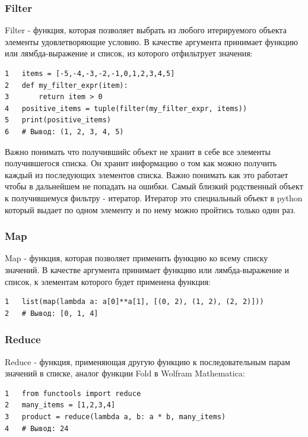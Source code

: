 \documentclass[12pt, a4paper]{article}
\begin{document}
\subsubsection{Filter}

Filter - функция, которая позволяет выбрать из любого 
итерируемого объекта элементы удовлетворяющие условию. 
В качестве аргумента принимает функцию или лямбда-выражение
и список, из которого отфильтрует значения:

\begin{verbatim}
1   items = [-5,-4,-3,-2,-1,0,1,2,3,4,5]
2   def my_filter_expr(item):
3       return item > 0
4   positive_items = tuple(filter(my_filter_expr, items))
5   print(positive_items)
6   # Вывод: (1, 2, 3, 4, 5)
\end{verbatim}

Важно понимать что получившийс объект не хранит в себе все 
элементы получившегося списка. Он хранит информацию о том 
как можно получить каждый из последующих элементов списка. 
Важно понимать как это работает чтобы в дальнейшем не попадать
на ошибки. Самый близкий родственный объект к получившемуся 
фильтру - итератор. Итератор это специальный объект в python 
который выдает по одном элементу и по нему можно пройтись 
только один раз.

\subsubsection{Map}

Map - функция, которая позволяет применить функцию ко всему 
списку значений. В качестве аргумента принимает функцию или 
лямбда-выражение и список, к элементам которого будет 
применена функция:

\begin{verbatim}
1   list(map(lambda a: a[0]**a[1], [(0, 2), (1, 2), (2, 2)]))
2   # Вывод: [0, 1, 4]
\end{verbatim}

\subsubsection{Reduce}

Reduce - функция, применяющая другую функцию к 
последовательным парам значений в списке, аналог функции
Fold в Wolfram Mathematica:

\begin{verbatim}
1   from functools import reduce
2   many_items = [1,2,3,4]
3   product = reduce(lambda a, b: a * b, many_items)
4   # Вывод: 24
\end{verbatim}
\end{document}
